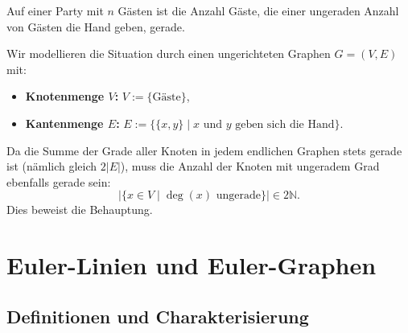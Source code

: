 \begin{math-stroke}
\begin{lemma}[Handschlaglemma]\label{lem:handschlaglemma}
Auf einer Party mit $n$ Gästen ist die Anzahl Gäste, die einer ungeraden Anzahl von Gästen die Hand geben, gerade.
\end{lemma}

\begin{short-proof}
Wir modellieren die Situation durch einen ungerichteten Graphen $G = (V, E)$ mit:
\begin{itemize}
    \item \textbf{Knotenmenge $V$:} $V := \{\text{Gäste}\}$,
    \item \textbf{Kantenmenge $E$:} $E := \{\{x, y\} \mid x \text{ und } y \text{ geben sich die Hand}\}$.
\end{itemize}
Da die Summe der Grade aller Knoten in jedem endlichen Graphen stets gerade ist (nämlich gleich $2|E|$), muss die Anzahl der Knoten mit ungeradem Grad ebenfalls gerade sein:
\[
\left| \{ x \in V \mid \deg(x) \text{ ungerade} \} \right| \in 2\mathbb{N}.
\]
Dies beweist die Behauptung.
\end{short-proof}
\end{math-stroke}

\section{Euler-Linien und Euler-Graphen}
\subsection{Definitionen und Charakterisierung}

